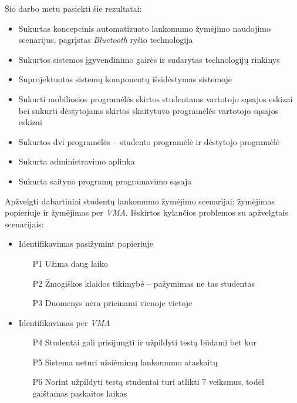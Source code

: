 \documentclass{VUMIFPSbakalaurinis}
\begin{document}

Šio darbo metu pasiekti šie rezultatai:

\begin{itemize}

	\item Sukurtas koncepcinis automatizuoto lankomumo žymėjimo naudojimo scenarijus, pagrįstas \textit{Bluetooth} ryšio technologija
	\item Sukurtos sistemos įgyvendinimo gairės ir sudarytas technologijų rinkinys
	\item Suprojektuotas sistemų komponentų išsidėstymas sistemoje
	\item Sukurti mobiliosios programėlės skirtos studentams vartotojo sąsajos eskizai bei sukurti dėstytojams skirtos skaitytuvo programėlės vartotojo sąsajos eskizai
	\item Sukurtos dvi programėlės – studento programėlė ir dėstytojo programėlė
	\item Sukurta administravimo aplinka
	\item Sukurta saityno programų programavimo sąsaja
\end{itemize}

Apžvelgti dabartiniai studentų lankomumo žymėjimo scenarijai: žymėjimas popieriuje ir žymėjimas per \textit{VMA}. Išskirtos kylančios problemos su apžvelgtais scenarijais:

\begin{itemize}
    \item Identifikavimas pasižymint popieriuje
    \begin{itemize}
        \item[P1] Užima daug laiko
        \item[P2] Žmogiškos klaidos tikimybė – pažymimas ne tas studentas
        \item[P3] Duomenys nėra prieinami vienoje vietoje
    \end{itemize}
    \item Identifikavimas per \textit{VMA}
    \begin{itemize}
        \item[P4] Studentai gali prisijungti ir užpildyti testą būdami bet kur
        \item[P5] Sistema neturi užsiėmimų lankomumo ataskaitų
        \item[P6] Norint užpildyti testą studentai turi atlikti 7 veiksmus, todėl gaištamas paskaitos laikas
    \end{itemize}
\end{itemize}
\end{document}
